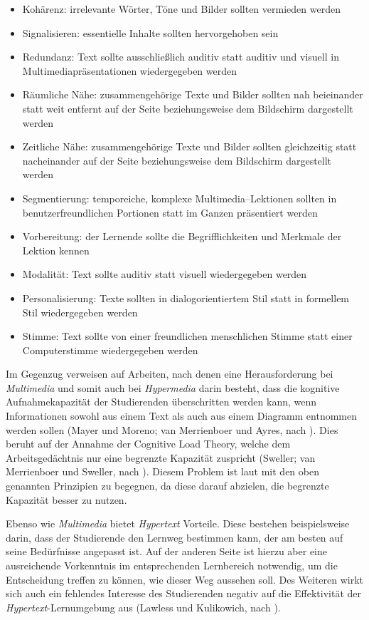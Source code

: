 \begin{itemize}
 \item  Kohärenz: irrelevante Wörter, Töne und Bilder sollten vermieden werden
 \item	Signalisieren: essentielle Inhalte sollten hervorgehoben sein
 \item	Redundanz: Text sollte ausschließlich auditiv statt auditiv und visuell in Multimediapräsentationen wiedergegeben werden
 \item	Räumliche Nähe: zusammengehörige Texte und Bilder sollten nah beieinander statt weit entfernt auf der Seite beziehungsweise dem Bildschirm dargestellt werden
 \item	Zeitliche Nähe: zusammengehörige Texte und Bilder sollten gleichzeitig statt nacheinander auf der Seite beziehungsweise dem Bildschirm dargestellt werden
 \item	Segmentierung: temporeiche, komplexe Multimedia–Lektionen sollten in benutzerfreundlichen Portionen statt im Ganzen präsentiert werden
 \item	Vorbereitung: der Lernende sollte die Begrifflichkeiten und Merkmale der Lektion kennen
 \item	Modalität: Text sollte auditiv statt visuell wiedergegeben werden
 \item	Personalisierung: Texte sollten in dialogorientiertem Stil statt in formellem Stil wiedergegeben werden
 \item	Stimme: Text sollte von einer freundlichen menschlichen Stimme statt einer Computerstimme wiedergegeben werden
\end{itemize}

Im Gegenzug verweisen \cite{moos2010multimedia} auf Arbeiten, nach denen eine Herausforderung bei \textit{Multimedia} und somit auch bei \textit{Hypermedia} darin besteht, dass die kognitive Aufnahmekapazität der Studierenden überschritten werden kann, wenn Informationen sowohl aus einem Text als auch aus einem Diagramm entnommen werden sollen (Mayer und Moreno; van Merrienboer und Ayres, nach \cite{moos2010multimedia}). Dies beruht auf der Annahme der Cognitive Load Theory, welche dem Arbeitsgedächtnis nur eine begrenzte Kapazität zuspricht (Sweller; van Merrienboer und Sweller, nach \cite{moos2010multimedia}). Diesem Problem ist laut \cite{mayer2009multimedia} mit den oben genannten Prinzipien zu begegnen, da diese darauf abzielen, die begrenzte Kapazität besser zu nutzen.

Ebenso wie \textit{Multimedia} bietet \textit{Hypertext} Vorteile. Diese bestehen beispielsweise darin, dass der Studierende den Lernweg bestimmen kann, der am besten auf seine Bedürfnisse angepasst ist. Auf der anderen Seite ist hierzu aber eine ausreichende Vorkenntnis im entsprechenden Lernbereich notwendig, um die Entscheidung treffen zu können, wie dieser Weg aussehen soll. Des Weiteren wirkt sich auch ein fehlendes Interesse des Studierenden negativ auf die Effektivität der \textit{Hypertext}-Lernumgebung aus (Lawless und Kulikowich, nach \cite{moos2010multimedia}).

